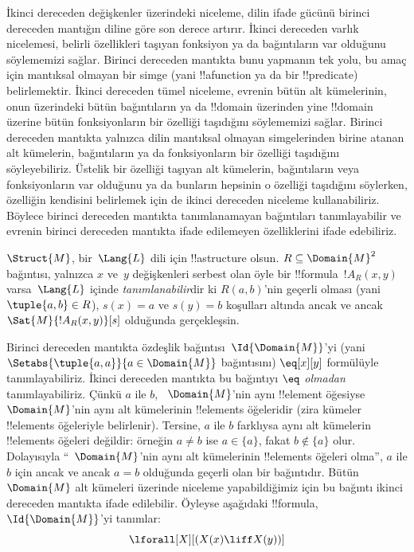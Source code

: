 \documentclass[../../../include/open-logic-section]{subfiles}
\begin{document}

\begin{explain}
İkinci dereceden değişkenler üzerindeki niceleme, dilin ifade gücünü birinci
dereceden mantığın diline göre son derece artırır. İkinci dereceden varlık
nicelemesi, belirli özellikleri taşıyan fonksiyon ya da bağıntıların var
olduğunu söylememizi sağlar. Birinci dereceden mantıkta bunu yapmanın tek
yolu, bu amaç için mantıksal olmayan bir simge (yani !!a{function} ya da
bir !!{predicate}) belirlemektir. İkinci dereceden tümel niceleme, evrenin
bütün alt kümelerinin, onun üzerindeki bütün bağıntıların ya da !!{domain}
üzerinden yine !!{domain} üzerine bütün fonksiyonların bir
özelliği taşıdığını söylememizi sağlar. Birinci dereceden mantıkta yalnızca
dilin mantıksal olmayan simgelerinden birine atanan alt kümelerin,
bağıntıların ya da fonksiyonların bir özelliği taşıdığını söyleyebiliriz.
Üstelik bir özelliği taşıyan alt kümelerin, bağıntıların veya fonksiyonların
var olduğunu ya da bunların hepsinin o özelliği taşıdığını söylerken,
özelliğin kendisini belirlemek için de ikinci dereceden niceleme
kullanabiliriz. Böylece birinci dereceden mantıkta tanımlanamayan bağıntıları
tanımlayabilir ve evrenin birinci dereceden mantıkta ifade edilemeyen
özelliklerini ifade edebiliriz.
\end{explain}

\begin{defn}
$\Struct{M}$, bir~$\Lang{L}$ dili için !!a{structure} olsun.
$R \subseteq \Domain{M}^2$ bağıntısı, yalnızca $x$ ve~$y$ değişkenleri
serbest olan öyle bir !!{formula}~$!A_R(x,y)$ varsa~$\Lang{L}$ içinde
\emph{tanımlanabilir}dir ki $R(a,b)$'nin geçerli olması (yani
$\tuple{a,b} \in R$), $s(x)=a$ ve $s(y)=b$ koşulları altında ancak ve ancak
$\Sat{M}{!A_R(x,y)}[s]$ olduğunda gerçekleşsin.
\end{defn}

\begin{ex}
Birinci dereceden mantıkta özdeşlik bağıntısı~$\Id{\Domain{M}}$'yi
(yani $\Setabs{\tuple{a,a}}{a \in \Domain{M}}$ bağıntısını)
$\eq[x][y]$ formülüyle tanımlayabiliriz. İkinci dereceden mantıkta bu
bağıntıyı \emph{$\eq$ olmadan} tanımlayabiliriz. Çünkü $a$ ile $b$,
~$\Domain{M}$'nin aynı !!{element} öğesiyse~$\Domain{M}$'nin aynı alt
kümelerinin !!{element}s öğeleridir (zira kümeler !!{element}s öğeleriyle
belirlenir). Tersine, $a$ ile $b$ farklıysa aynı alt kümelerin !!{element}s
öğeleri değildir: örneğin $a \neq b$ ise $a \in \{a\}$, fakat
$b \notin \{a\}$ olur. Dolayısıyla ``~$\Domain{M}$'nin aynı alt
kümelerinin !!{element}s öğeleri olma'', $a$ ile $b$ için ancak ve ancak
$a=b$ olduğunda geçerli olan bir bağıntıdır. Bütün~$\Domain{M}$ alt kümeleri
üzerinde niceleme yapabildiğimiz için bu bağıntı ikinci dereceden mantıkta
ifade edilebilir. Öyleyse aşağıdaki !!{formula}, $\Id{\Domain{M}}$'yi
tanımlar:
\[
\lforall[X][(X(x) \liff X(y))]
\]
\end{ex}
\end{document}
